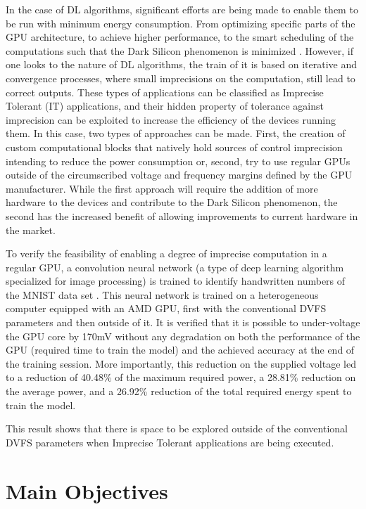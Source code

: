 In the case of DL algorithms, significant efforts are being made to enable them to be run with minimum energy consumption. From optimizing specific parts of the GPU architecture, to achieve higher performance, to the smart scheduling of the computations such that the Dark Silicon phenomenon is minimized \cite{esmaeilzadeh_dark_2011}. However, if one looks to the nature of DL algorithms, the train of it is based on iterative and convergence processes, where small imprecisions on the computation, still lead to correct outputs. These types of applications can be classified as Imprecise Tolerant (IT) applications, and their hidden property of tolerance against imprecision can be exploited to increase the efficiency of the devices running them. In this case, two types of approaches can be made. First, the creation of custom computational blocks that natively hold sources of control imprecision intending to reduce the power consumption \cite{mahdiani_efficient_2017} or, second, try to use regular GPUs outside of the circumscribed voltage and frequency margins defined by the GPU manufacturer. While the first approach will require the addition of more hardware to the devices and contribute to the Dark Silicon phenomenon, the second has the increased benefit of allowing improvements to current hardware in the market. 

To verify the feasibility of enabling a degree of imprecise computation in a regular GPU, a convolution neural network (a type of deep learning algorithm specialized for image processing) is trained to identify handwritten numbers of the MNIST data set \cite{noauthor_mnist_nodate}. This neural network is trained on a heterogeneous computer equipped with an AMD GPU, first with the conventional DVFS parameters and then outside of it. It is verified that it is possible to under-voltage the GPU core by 170mV without any degradation on both the performance of the GPU (required time to train the model) and the achieved accuracy at the end of the training session. More importantly, this reduction on the supplied voltage led to a reduction of 40.48\% of the maximum required power, a 28.81\% reduction on the average power, and a 26.92\% reduction of the total required energy spent to train the model.

This result shows that there is space to be explored outside of the conventional DVFS parameters when Imprecise Tolerant applications are being executed.


\section{Main Objectives}
\label{section:objectives}


